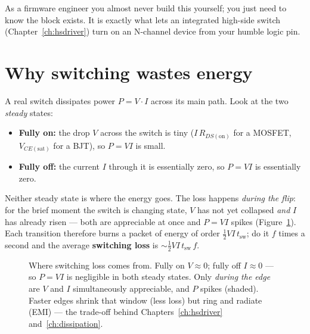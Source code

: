 \documentclass[11pt,a4paper,oneside]{book}
\begin{document}
\begin{note}
As a firmware engineer you almost never build this yourself; you just need to know the
block exists. It is exactly what lets an integrated high-side switch
(Chapter~\ref{ch:hsdriver}) turn on an N-channel device from your humble logic pin.
\end{note}

\section{Why switching wastes energy}
A real switch dissipates power $P=V\cdot I$ across its main path. Look at the two
\emph{steady} states:
\begin{itemize}[leftmargin=1.4cm]
  \item \textbf{Fully on:} the drop $V$ across the switch is tiny ($I\,R_{DS(\text{on})}$
        for a MOSFET, $V_{CE(\text{sat})}$ for a BJT), so $P=VI$ is small.
  \item \textbf{Fully off:} the current $I$ through it is essentially zero, so $P=VI$ is
        essentially zero.
\end{itemize}
Neither steady state is where the energy goes. The loss happens \emph{during the flip}: for
the brief moment the switch is changing state, $V$ has not yet collapsed \emph{and} $I$ has
already risen --- both are appreciable at once and $P=VI$ spikes (Figure~\ref{fig:swloss}).
Each transition therefore burns a packet of energy of order $\tfrac12 V I\,t_{\text{sw}}$;
do it $f$ times a second and the average \textbf{switching loss} is
$\sim\tfrac12 V I\,t_{\text{sw}}\,f$.

\begin{figure}[h]
\centering
{}
\caption{Where switching loss comes from. Fully on $V\approx0$; fully off $I\approx0$ ---
so $P=VI$ is negligible in both steady states. Only \emph{during the edge} are $V$ and $I$
simultaneously appreciable, and $P$ spikes (shaded). Faster edges shrink that window (less
loss) but ring and radiate (EMI) --- the trade-off behind Chapters~\ref{ch:hsdriver}
and~\ref{ch:dissipation}.}
\label{fig:swloss}
\end{figure}
\end{document}
